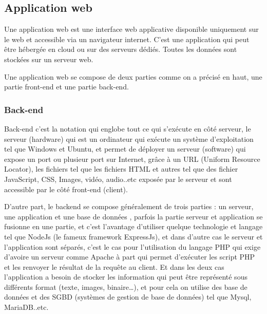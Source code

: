 \subsection{Application web  }
\par Une application web est une interface web applicative disponible
uniquement sur le web et accessible via un navigateur internet. C’est une
application qui peut être hébergée en cloud ou sur des serveurs dédiés. Toutes
les données sont stockées sur un serveur web.\cite{ref8}
\par Une application web se compose de deux parties comme on a précisé en haut,
une partie front-end et une partie back-end.
\subsubsection{Back-end }
\par Back-end c’est la notation qui englobe tout ce qui s'exécute en côté
serveur, le serveur (hardware)  qui est un ordinateur qui exécute un système
d’exploitation tel que Windows et Ubuntu, et permet de déployer un serveur
(software) qui expose un port ou plusieur port sur Internet, grâce à un URL
(Uniform Resource Locator), les fichiers tel que les fichiers HTML et autres
tel que des fichier JavaScript, CSS, Images, vidéo, audio..etc exposée par le
serveur et sont accessible par le côté front-end (client).
\par D'autre part, le backend se compose généralement de trois parties : un
serveur, une application et une base de données \cite{ref9}, parfois la partie
serveur et application se fusionne en une partie, et c’est l'avantage
d’utiliser quelque technologie et langage tel que NodeJs (le fameux framework
ExpressJs), et dans d’autre cas le serveur et l’application sont séparés, c’est
le cas pour l’utilisation du langage PHP qui exige d’avoire un serveur comme
Apache à part qui permet d'exécuter les script PHP et les renvoyer le résultat
de la requête au client. Et dans les deux cas l’application a besoin de stocker
les information qui peut être représenté sous différents format (texte, images,
binaire…), et pour cela on utilise des base de données et des SGBD (systèmes de
gestion de base de données) tel que Mysql, MariaDB..etc.
